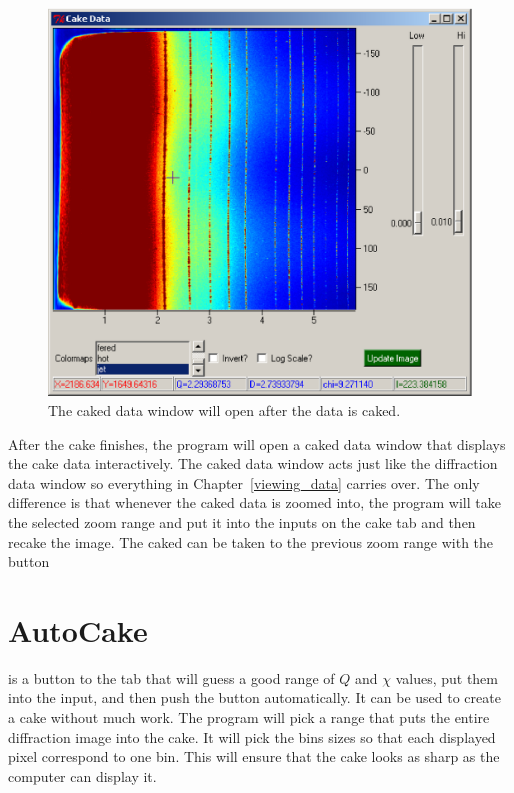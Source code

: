 \begin{figure}
    \centering
    \includegraphics[scale=.75]{figures/cake_data_window.eps}
    \caption{The caked data window will open after the
    data is caked.} 
    \label{cake_data_window}
\end{figure}

After the cake finishes, the program will open a caked data
window that displays the cake data interactively.
The caked data window acts just like the diffraction
data window so everything in Chapter~\ref{viewing_data} 
carries over. The only difference is that whenever
the caked data is zoomed into, the program will take
the selected zoom range and put it into the inputs on
the cake tab and then recake the image. The caked 
can be taken to the previous zoom range with the 
 button 

\section{AutoCake}

 is a button to the  tab that 
will guess a good range of $Q$ and $\chi$ 
values, put them into the input, and then push the 
 button automatically. It can be used to
create a cake without much work. The program will pick a range
that puts the entire diffraction image into the cake. It will pick
the bins sizes so that each displayed pixel correspond to one bin. 
This will ensure that the cake looks as sharp as the computer 
can display it.

